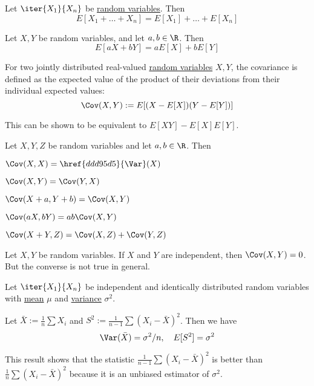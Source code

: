 Let $\iter{X_1}{X_n}$ be \href{b96960b}{random variables}. Then
$$
  E[X_1+\ldots+X_n]=E[X_1]+\ldots+E[X_n]
$$

\label{e1bddba}

Let $X,Y$ be random variables, and let $a,b\in\R$. Then
$$
  E[aX+bY]=aE[X]+bE[Y]
$$

\label{d43f610}

For two jointly distributed real-valued \href{b96960b}{random variables} $X,Y$,
the covariance is defined as the expected value of the product of their
deviations from their individual expected values:
$$
  \Cov(X,Y):=E[(X-E[X])(Y-E[Y])]
$$

This can be shown to be equivalent to $E[XY]-E[X]E[Y]$.

\label{fedfd56}

Let $X,Y,Z$ be random variables and let $a,b\in\R$. Then
\begin{enumerata}
  \item $\Cov(X,X)=\href{ddd95d5}{\Var}(X)$
  \item $\Cov(X,Y)=\Cov(Y,X)$
  \item $\Cov(X+a,Y+b)=\Cov(X,Y)$
  \item $\Cov(aX,bY)=ab\Cov(X,Y)$
  \item $\Cov(X+Y,Z)=\Cov(X,Z)+\Cov(Y,Z)$
\end{enumerata}

\label{f7c7611}

Let $X,Y$ be random variables. If $X$ and $Y$ are independent, then
$\Cov(X,Y)=0$. But the converse is not true in general.

\label{feea370}

Let $\iter{X_1}{X_n}$ be independent and identically distributed random
variables with \href{d13ac42}{mean} $\mu$ and \href{ddd95d5}{variance}
$\sigma^2$.

Let $\bar X:=\frac1n\sum X_i$ and $S^2:=\frac1{n-1}\sum(X_i-\bar X)^2$. Then we
have
$$
  \Var(\bar X)=\sigma^2/n,\quad E[S^2]=\sigma^2
$$

This result shows that the statistic $\frac1{n-1}\sum(X_i-\bar X)^2$ is better
than $\frac1n\sum(X_i-\bar X)^2$ because it is an unbiased estimator of
$\sigma^2$.

